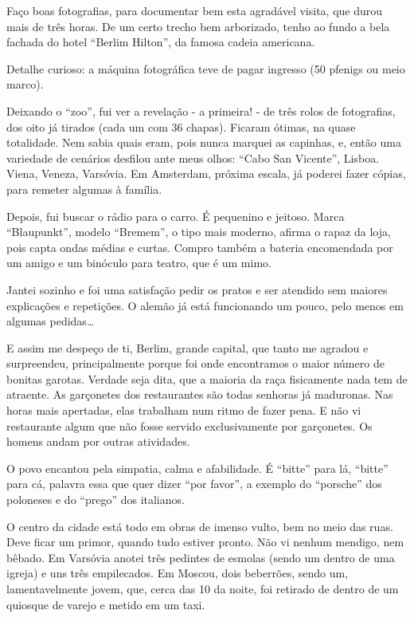 Faço boas fotografias, para documentar bem esta agradável visita, que durou mais de três horas. De um certo trecho bem arborizado, tenho ao fundo a bela fachada do hotel “Berlim Hilton”, da famosa cadeia americana.

Detalhe curioso: a máquina fotográfica teve de pagar ingresso (50 pfenigs ou meio marco).

Deixando o “zoo”, fui ver a revelação - a primeira! - de três rolos de fotografias, dos oito já tirados (cada um com 36 chapas). Ficaram ótimas, na quase totalidade. Nem sabia quais eram, pois nunca marquei as capinhas, e, então uma variedade de cenários desfilou ante meus olhos: “Cabo San Vicente”, Lisboa. Viena, Veneza, Varsóvia. Em Amsterdam, próxima escala, já poderei fazer cópias, para remeter algumas à família.

Depois, fui buscar o rádio para o carro. É pequenino e jeitoso. Marca “Blaupunkt”, modelo “Bremem”, o tipo mais moderno, afirma o rapaz da loja, pois capta ondas médias e curtas. Compro também a bateria encomendada por um amigo e um binóculo para teatro, que é um mimo.

Jantei sozinho e foi uma satisfação pedir os pratos e ser atendido sem maiores explicações e repetições. O alemão já está funcionando um pouco, pelo menos em algumas pedidas\ldots

E assim me despeço de ti, Berlim, grande capital, que tanto me agradou e surpreendeu, principalmente porque foi onde encontramos o maior número de bonitas garotas. Verdade seja dita, que a maioria da raça fisicamente nada tem de atraente. As garçonetes dos restaurantes são todas senhoras já maduronas. Nas horas mais apertadas, elas trabalham num ritmo de fazer pena. E não vi restaurante algum que não fosse servido exclusivamente por garçonetes. Os homens andam por outras atividades.

O povo encantou pela simpatia, calma e afabilidade. É “bitte” para lá, “bitte” para cá, palavra essa que quer dizer “por favor”, a exemplo do “porsche” dos poloneses e do “prego” dos italianos.

O centro da cidade está todo em obras de imenso vulto, bem no meio das ruas. Deve ficar um primor, quando tudo estiver pronto. Não vi nenhum mendigo, nem bêbado. Em Varsóvia anotei três pedintes de esmolas (sendo um dentro de uma igreja) e uns três empilecados. Em Moscou, dois beberrões, sendo um, lamentavelmente jovem, que, cerca das 10 da noite, foi retirado de dentro de um quiosque de varejo e metido em um taxi.

